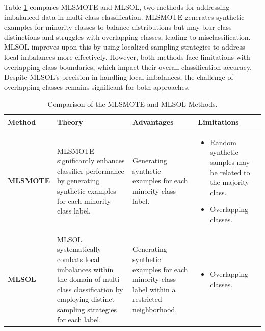     Table \ref{table:imbalanced} compares MLSMOTE and MLSOL, two methods for addressing imbalanced data in multi-class classification. MLSMOTE generates synthetic examples for minority classes to balance distributions but may blur class distinctions and struggles with overlapping classes, leading to misclassification. MLSOL improves upon this by using localized sampling strategies to address local imbalances more effectively. However, both methods face limitations with overlapping class boundaries, which impact their overall classification accuracy. Despite MLSOL's precision in handling local imbalances, the challenge of overlapping classes remains significant for both approaches.
\begin{table}[!ht]

    \centering
    \caption{Comparison of the MLSMOTE and MLSOL Methods.}
    \label{table:imbalanced}

    \small %
    \renewcommand{\arraystretch}{1} %
    \setlength{\tabcolsep}{4pt} %
    \setlength{\arrayrulewidth}{0.15mm}

    \begin{tabularx}{\textwidth}{|>{\centering\arraybackslash\bfseries}p{2cm}|
                                       >{\raggedright\arraybackslash}X|
                                       >{\raggedright\arraybackslash}X|
                                       >{\raggedright\arraybackslash}X|}
    \hline
    \textbf{Method} & \textbf{Theory} & \textbf{Advantages} & \textbf{Limitations} \\ 
    \hline
    \textbf{MLSMOTE \cite{charte2015mlsmote}} & 
    MLSMOTE significantly enhances classifier performance by generating synthetic examples for each minority class label. & 
    Generating synthetic examples for each minority class label. & 
    \begin{itemize}[leftmargin=*]
        \item Random synthetic samples may be related to the majority class.
        \item Overlapping classes.
    \end{itemize} \\ 
    \hline
    \textbf{MLSOL \cite{liu2022multi}} & 
    MLSOL systematically combats local imbalances within the domain of multi-class classification by employing distinct sampling strategies for each label. & 
    Generating synthetic examples for each minority class label within a restricted neighborhood. & 
    \begin{itemize}[leftmargin=*]
        \item Overlapping classes.
    \end{itemize} \\
    \hline
    \end{tabularx}
    \end{table}

